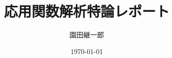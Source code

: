 \documentclass[a4paper,11pt]{jsarticle}
\begin{document}
\title{応用関数解析特論レポート}
\author{園田継一郎}
\date{\today}
\maketitle
\end{document}
